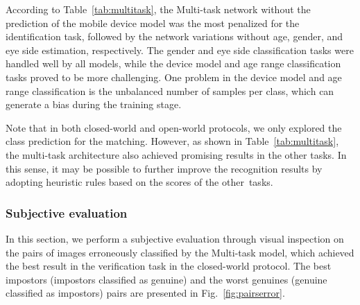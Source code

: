 \documentclass[journal]{IEEEtran}
\begin{document}
According to Table~\ref{tab:multitask}, the Multi-task network without the prediction of the mobile device model was the most penalized for the identification task, followed by the network variations without age, gender, and eye side estimation, respectively.
The gender and eye side classification tasks were handled well by all models, while the device model and age range classification tasks proved to be more challenging.
One problem in the device model and age range classification is the unbalanced number of samples per class, which can generate a bias during the training stage.

Note that in both closed-world and open-world protocols, we only explored the class prediction for the matching.
However, as shown in Table~\ref{tab:multitask}, the multi-task architecture also achieved promising results in the other tasks.
In this sense, it may be possible to further improve the recognition results by adopting heuristic rules based on the scores of the other~tasks.

\subsubsection{Subjective evaluation}
\label{sec:subjective}

In this section, we perform a subjective evaluation through visual inspection on the pairs of images erroneously classified by the Multi-task model, which achieved the best result in the verification task in the closed-world protocol.
The best impostors (impostors classified as genuine) and the worst genuines (genuine classified as impostors) pairs are presented in Fig.~\ref{fig:pairserror}.
\end{document}
